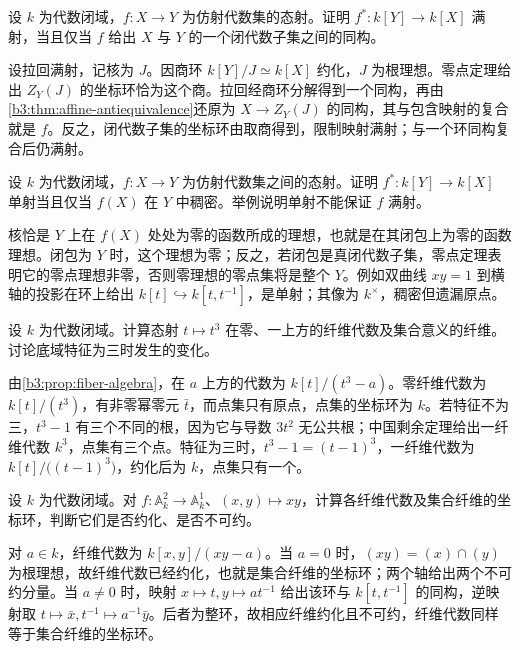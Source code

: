 \begin{exercise}\label{b3:ex:07-closed-embedding}
	设 \(k\) 为代数闭域，\(f:X\to Y\) 为仿射代数集的态射。证明 \(f^*:k[Y]\to k[X]\) 满射，当且仅当 \(f\) 给出 \(X\) 与 \(Y\) 的一个闭代数子集之间的同构。
\end{exercise}
\begin{solution}
	设拉回满射，记核为 \(J\)。因商环 \(k[Y]/J\simeq k[X]\) 约化，\(J\) 为根理想。零点定理给出 \(Z_Y(J)\) 的坐标环恰为这个商。拉回经商环分解得到一个同构，再由\cref{b3:thm:affine-antiequivalence}还原为 \(X\to Z_Y(J)\) 的同构，其与包含映射的复合就是 \(f\)。反之，闭代数子集的坐标环由取商得到，限制映射满射；与一个环同构复合后仍满射。
\end{solution}

\begin{exercise}\label{b3:ex:07-dense-image}
	设 \(k\) 为代数闭域，\(f:X\to Y\) 为仿射代数集之间的态射。证明 \(f^*:k[Y]\to k[X]\) 单射当且仅当 \(f(X)\) 在 \(Y\) 中稠密。举例说明单射不能保证 \(f\) 满射。
\end{exercise}
\begin{solution}
	核恰是 \(Y\) 上在 \(f(X)\) 处处为零的函数所成的理想，也就是在其闭包上为零的函数理想。闭包为 \(Y\) 时，这个理想为零；反之，若闭包是真闭代数子集，零点定理表明它的零点理想非零，否则零理想的零点集将是整个 \(Y\)。例如双曲线 \(xy=1\) 到横轴的投影在环上给出 \(k[t]\hookrightarrow k[t,t^{-1}]\)，是单射；其像为 \(k^\times\)，稠密但遗漏原点。
\end{solution}

\begin{exercise}\label{b3:ex:07-cubic-fibers}
	设 \(k\) 为代数闭域。计算态射 \(t\mapsto t^3\) 在零、一上方的纤维代数及集合意义的纤维。讨论底域特征为三时发生的变化。
\end{exercise}
\begin{solution}
	由\cref{b3:prop:fiber-algebra}，在 \(a\) 上方的代数为 \(k[t]/(t^3-a)\)。零纤维代数为 \(k[t]/(t^3)\)，有非零幂零元 \(\bar t\)，而点集只有原点，点集的坐标环为 \(k\)。若特征不为三，\(t^3-1\) 有三个不同的根，因为它与导数 \(3t^2\) 无公共根；中国剩余定理给出一纤维代数 \(k^3\)，点集有三个点。特征为三时，\(t^3-1=(t-1)^3\)，一纤维代数为 \(k[t]/\bigl((t-1)^3\bigr)\)，约化后为 \(k\)，点集只有一个。
\end{solution}

\begin{exercise}\label{b3:ex:07-product-fibers}
	设 \(k\) 为代数闭域。对 \(f:\mathbb A_k^2\to\mathbb A_k^1\)、\((x,y)\mapsto xy\)，计算各纤维代数及集合纤维的坐标环，判断它们是否约化、是否不可约。
\end{exercise}
\begin{solution}
	对 \(a\in k\)，纤维代数为 \(k[x,y]/(xy-a)\)。当 \(a=0\) 时，\((xy)=(x)\cap(y)\) 为根理想，故纤维代数已经约化，也就是集合纤维的坐标环；两个轴给出两个不可约分量。当 \(a\ne0\) 时，映射 \(x\mapsto t,y\mapsto at^{-1}\) 给出该环与 \(k[t,t^{-1}]\) 的同构，逆映射取 \(t\mapsto\bar x,t^{-1}\mapsto a^{-1}\bar y\)。后者为整环，故相应纤维约化且不可约，纤维代数同样等于集合纤维的坐标环。
\end{solution}

